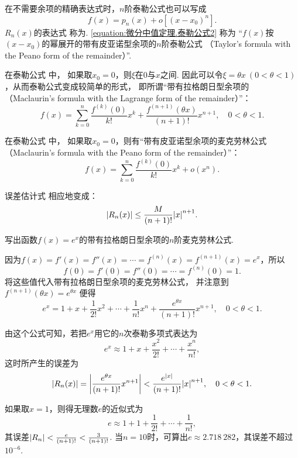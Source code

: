 在不需要余项的精确表达式时，\(n\)阶泰勒公式也可以写成
\begin{equation}\label{equation:微分中值定理.泰勒公式2}
	f(x) = p_n(x) + o[(x - x_0)^n].
\end{equation}
\(R_n(x)\)的表达式  称为.
\cref{equation:微分中值定理.泰勒公式2} 称为
“\(f(x)\)按\((x-x_0)\)的幂展开的带有皮亚诺型余项的\(n\)阶泰勒公式
（Taylor's formula with the Peano form of the remainder）”.

在泰勒公式  中，
如果取\(x_0 = 0\)，则\(\xi\)在\(0\)与\(x\)之间.
因此可以令\(\xi = \theta x\ (0 < \theta < 1)\)，从而泰勒公式变成较简单的形式，
即所谓“带有拉格朗日型余项的
（Maclaurin's formula with the Lagrange form of the remainder）”：
\begin{equation}\label{equation:微分中值定理.泰勒公式3}
	f(x)=\sum_{k=0}^n \frac{f^{(k)}(0)}{k!} x^k
		+ \frac{f^{(n+1)}(\theta x)}{(n+1)!} x^{n+1},
	\quad 0 < \theta < 1.
\end{equation}

在泰勒公式  中，
如果取\(x_0 = 0\)，则有“带有皮亚诺型余项的麦克劳林公式
（Maclaurin's formula with the Peano form of the remainder）”：
\begin{equation}\label{equation:微分中值定理.泰勒公式4}
	f(x)=\sum_{k=0}^n \frac{f^{(k)}(0)}{k!} x^k + o(x^n).
\end{equation}

误差估计式  相应地变成：
\begin{equation}\label{equation:微分中值定理.泰勒公式.误差2}
	\abs{R_n(x)} \leq \frac{M}{(n+1)!} \abs{x}^{n+1}.
\end{equation}

\begin{example}
写出函数\(f(x) = e^x\)的带有拉格朗日型余项的\(n\)阶麦克劳林公式.
\begin{solution}
因为\(f(x)=f'(x)=f''(x)=\dotsb=f^{(n)}(x)=f^{(n+1)}(x)=e^x\)，所以\[
	f(0)=f'(0)=f''(0)=\dotsb=f^{(n)}(0)=1.
\]
将这些值代入带有拉格朗日型余项的麦克劳林公式，
并注意到\(f^{(n+1)}(\theta x) = e^{\theta x}\)
便得\[
	e^x = 1 + x + \frac{1}{2!} x^2 + \dotsb
	+ \frac{1}{n!} x^n + \frac{e^{\theta x}}{(n+1)!} x^{n+1},
	\quad 0 < \theta < 1.
\]

由这个公式可知，若把\(e^x\)用它的\(n\)次泰勒多项式表达为\[
	e^x \approx 1 + x + \frac{x^2}{2!} + \dotsb + \frac{x^n}{n!},
\]
这时所产生的误差为\[
	\abs{R_n(x)} = \abs{\frac{e^{\theta x}}{(n+1)!} x^{n+1}}
	< \frac{e^{\abs{x}}}{(n+1)!} \abs{x}^{n+1},
	\quad 0 < \theta < 1.
\]

如果取\(x = 1\)，则得无理数\(e\)的近似式为\[
	e \approx 1 + 1 + \frac{1}{2!} + \dotsb + \frac{1}{n!},
\]
其误差\(\abs{R_n} < \frac{e}{(n+1)!} < \frac{3}{(n+1)!}\).
当\(n=10\)时，可算出\(e \approx 2.718\ 282\)，其误差不超过\(10^{-6}\).
\end{solution}
\end{example}

